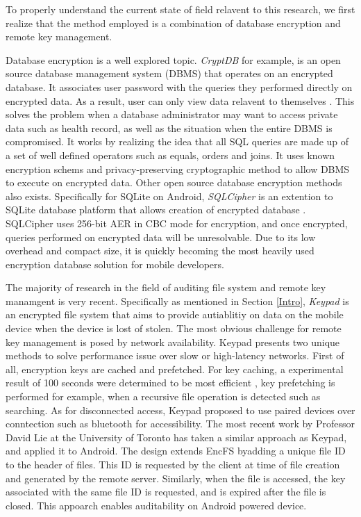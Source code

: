 To properly understand the current state of field relavent to this research, we first realize that the method employed is a combination of database encryption and remote key management.

Database encryption is a well explored topic. \textit{CryptDB} for example, is an open source database management system (DBMS) that operates on an encrypted database. It associates user password with the queries they performed directly on encrypted data. As a result, user can only view data relavent to themselves \cite{popa2011}. This solves the problem when a database administrator may want to access private data such as health record, as well as the situation when the entire DBMS is compromised. It works by realizing the idea that all SQL queries are made up of a set of well defined operators such as equals, orders and joins. It uses known encryption schems and privacy-preserving cryptographic method to allow DBMS to execute on encrypted data. Other open source database encryption methods also exists. Specifically for SQLite on Android, \textit{SQLCipher} is an extention to SQLite database platform that allows creation of encrypted database \cite{SqlCipher2008}. SQLCipher uses 256-bit AER in CBC mode for encryption, and once encrypted, queries performed on encrypted data will be unresolvable. Due to its low overhead and compact size, it is quickly becoming the most heavily used encryption database solution for mobile developers.

The majority of research in the field of auditing file system and remote key manamgent is very recent. Specifically as mentioned in Section \ref{Intro}, \textit{Keypad} is an encrypted file system that aims to provide autiablitiy on data on the mobile device when the device is lost of stolen. The most obvious challenge for remote key management is posed by network availability. Keypad presents two unique methods to solve performance issue over slow or high-latency networks. First of all, encryption keys are cached and prefetched. For key caching, a experimental result of 100 seconds were determined to be most efficient \cite{Roxana2011}, key prefetching is performed for example, when a recursive file operation is detected such as searching. As for disconnected access, Keypad proposed to use paired devices over conntection such as bluetooth for accessibility. The most recent work by Professor David Lie at the University of Toronto has taken a similar approach as Keypad, and applied it to Android. The design extends EncFS \cite{encfs} byadding a unique file ID to the header of files. This ID is requested by the client at time of file creation and generated by the remote server. Similarly, when the file is accessed, the key associated with the same file ID is requested, and is expired after the file is closed. This appoarch enables auditability on Android powered device.

